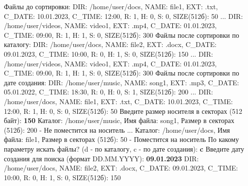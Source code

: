 \documentclass[a4paper,12pt]{article}
\begin{document}
Файлы до сортировки:
DIR: /home/user/docs, NAME: file1, EXT: .txt, C\_DATE: 10.01.2023, C\_TIME: 12:00, R: 1, H: 0, S: 0, SIZE(512б): 50 \newline
...
\newline
DIR: /home/user/videos, NAME: video1, EXT: .mp4, C\_DATE: 01.01.2023, C\_TIME: 09:00, R: 1, H: 1, S: 0, SIZE(512б): 300
\newline
Файлы после сортировки по каталогу: \newline
DIR: /home/user/docs, NAME: file2, EXT: .docx, C\_DATE: 09.01.2023, C\_TIME: 10:00, R: 0, H: 1, S: 0, SIZE(512б): 150
\newline
...
\newline
DIR: /home/user/videos, NAME: video1, EXT: .mp4, C\_DATE: 01.01.2023, C\_TIME: 09:00, R: 1, H: 1, S: 0, SIZE(512б): 300
\newline
Файлы после сортировки по дате создания: \newline
DIR: /home/user/music, NAME: song1, EXT: .mp3, C\_DATE: 05.01.2022, C\_TIME: 18:30, R: 0, H: 0, S: 1, SIZE(512б): 200
\newline
...
\newline
DIR: /home/user/docs, NAME: file1, EXT: .txt, C\_DATE: 10.01.2023, C\_TIME: 12:00, R: 1, H: 0, S: 0, SIZE(512б): 50
\newline
Введите размер носителя в секторах (512 байт): \textbf{150} \newline
Каталог: /home/user/music, Имя файла: song1, Размер в секторах (512б): 200 - Не поместится на носитель
\newline
...
\newline
Каталог: /home/user/docs, Имя файла: file1, Размер в секторах (512б): 50 - Поместится на носитель
\newline
По какому параметру искать файлы? (d - по каталогу, c - по дате создания): \textbf{c} \newline
Введите дату создания для поиска (формат DD.MM.YYYY): \textbf{09.01.2023} \newline
DIR: /home/user/docs, NAME: file2, EXT: .docx, C\_DATE: 09.01.2023, C\_TIME: 10:00, R: 0, H: 1, S: 0, SIZE(512б): 150 \newline

	
	\renewcommand{\arraystretch}{1.5} %
\end{document}
